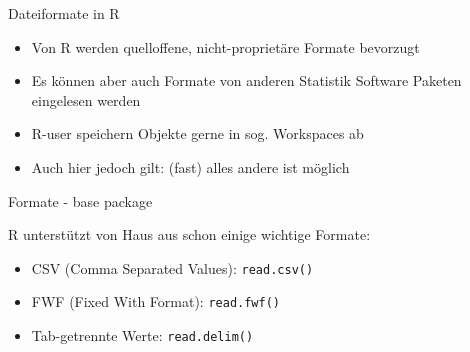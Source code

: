 \documentclass[
  ignorenonframetext,
]{beamer}
\providecommand{\tightlist}{%
  \setlength{\itemsep}{0pt}\setlength{\parskip}{0pt}}
\begin{document}
\begin{frame}{Dateiformate in R}
\protect\hypertarget{dateiformate-in-r}{}

\begin{itemize}
\tightlist
\item
  Von R werden quelloffene, nicht-proprietäre Formate bevorzugt
\item
  Es können aber auch Formate von anderen Statistik Software Paketen
  eingelesen werden
\item
  R-user speichern Objekte gerne in sog. Workspaces ab
\item
  Auch hier jedoch gilt: (fast) alles andere ist möglich
\end{itemize}

\end{frame}

\begin{frame}[fragile]{Formate - base package}
\protect\hypertarget{formate---base-package}{}

R unterstützt von Haus aus schon einige wichtige Formate:

\begin{itemize}
\tightlist
\item
  CSV (Comma Separated Values): \texttt{read.csv()}
\item
  FWF (Fixed With Format): \texttt{read.fwf()}
\item
  Tab-getrennte Werte: \texttt{read.delim()}
\end{itemize}

\end{frame}
\end{document}
